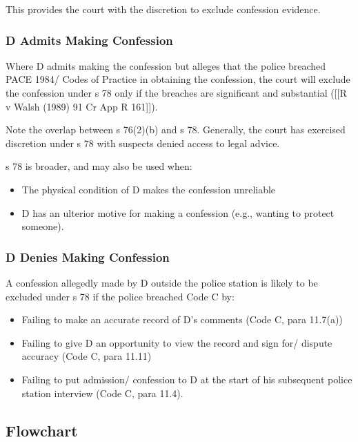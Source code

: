 \documentclass[
]{article}
\providecommand{\tightlist}{%
  \setlength{\itemsep}{0pt}\setlength{\parskip}{0pt}}
\begin{document}
This provides the court with the discretion to exclude confession
evidence.

\hypertarget{d-admits-making-confession}{%
\subsubsection{D Admits Making
Confession}\label{d-admits-making-confession}}

Where D admits making the confession but alleges that the police
breached PACE 1984/ Codes of Practice in obtaining the confession, the
court will exclude the confession under s 78 only if the breaches are
significant and substantial ({[}{[}R v Walsh (1989) 91 Cr App R
161{]}{]}).

Note the overlap between s 76(2)(b) and s 78. Generally, the court has
exercised discretion under s 78 with suspects denied access to legal
advice.

s 78 is broader, and may also be used when:

\begin{itemize}
\tightlist
\item
  The physical condition of D makes the confession unreliable
\item
  D has an ulterior motive for making a confession (e.g., wanting to
  protect someone).
\end{itemize}

\hypertarget{d-denies-making-confession}{%
\subsubsection{D Denies Making
Confession}\label{d-denies-making-confession}}

A confession allegedly made by D outside the police station is likely to
be excluded under s 78 if the police breached Code C by:

\begin{itemize}
\tightlist
\item
  Failing to make an accurate record of D's comments (Code C, para
  11.7(a))
\item
  Failing to give D an opportunity to view the record and sign for/
  dispute accuracy (Code C, para 11.11)
\item
  Failing to put admission/ confession to D at the start of his
  subsequent police station interview (Code C, para 11.4).
\end{itemize}

\hypertarget{flowchart}{%
\subsection{Flowchart}\label{flowchart}}
\end{document}
